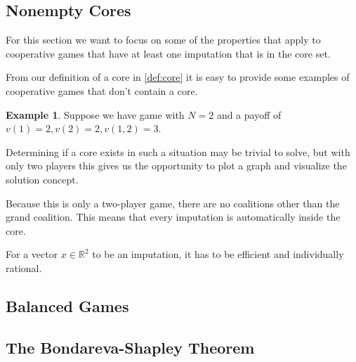 \documentclass[10pt,a4paper,titlepage]{article}
\theoremstyle{plain}
\theoremstyle{definition}
\newtheorem{exmp}[thm]{Example} %
\begin{document}
 \subsection{Nonempty Cores}
 For this section we want to focus on some of the properties that apply to cooperative games that have at least one imputation that is in the core set.

 From our definition of a core in \ref{def:core} it is easy to provide some examples of cooperative games that don't contain a core.

 \begin{exmp}
    Suppose we have game with $N = 2$ and a payoff of $v(1) = 2, v(2) = 2, v(1, 2) = 3$.

    Determining if a core exists in such a situation may be trivial to solve, but with only two players this gives us the opportunity to plot a graph and visualize the solution concept.
    
    Because this is only a two-player game, there are no coalitions other than the grand coalition. This means that every imputation is automatically inside the core.

    For a vector $x \in \mathbb{R}^2$ to be an imputation, it has to be efficient and individually rational.

 \end{exmp}
 

 \subsection{Balanced Games}

 \subsection{The Bondareva-Shapley Theorem}
\end{document}
